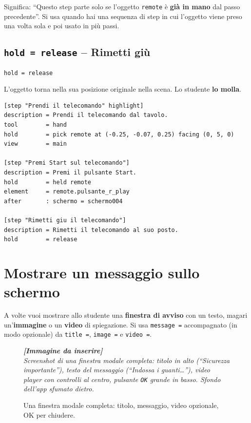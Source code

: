 ﻿\documentclass[a4paper,12pt,oneside]{book}
\newcommand{\kw}[1]{\texttt{\color{keycolor}#1}}
\newcommand{\imgph}[2]{%
  \begin{tcolorbox}[colback=cvtlightblue!30,colframe=cvtblue!40,%
    width=#1,halign=center,valign=center,height=5cm,boxrule=0.5pt,arc=3pt]%
    \textcolor{cvtgray}{\itshape\footnotesize\textbf{[Immagine da inserire]}\\[3pt]#2}%
  \end{tcolorbox}}
\begin{document}
Significa: ``Questo step parte solo se l'oggetto \texttt{remote} è
\textbf{già in mano} dal passo precedente''. Si usa quando hai una sequenza di
step in cui l'oggetto viene preso una volta sola e poi usato in più passi.

\section{\texttt{hold = release} -- Rimetti giù}

\begin{lstlisting}
hold = release
\end{lstlisting}

L'oggetto torna nella sua posizione originale nella scena. Lo studente
\textbf{lo molla}.

\begin{esempiocvt}
\begin{lstlisting}
[step "Prendi il telecomando" highlight]
description = Prendi il telecomando dal tavolo.
tool        = hand
hold        = pick remote at (-0.25, -0.07, 0.25) facing (0, 5, 0)
view        = main

[step "Premi Start sul telecomando"]
description = Premi il pulsante Start.
hold        = held remote
element     = remote.pulsante_r_play
after       : schermo = schermo004

[step "Rimetti giu il telecomando"]
description = Rimetti il telecomando al suo posto.
hold        = release
\end{lstlisting}
\end{esempiocvt}

\chapter{Mostrare un messaggio sullo schermo}
\label{ch:message}

A volte vuoi mostrare allo studente una \textbf{finestra di avviso} con un
testo, magari un'\textbf{immagine} o un \textbf{video} di spiegazione. Si usa
\kw{message =} accompagnato (in modo opzionale) da \kw{title =}, \kw{image =}
e \kw{video =}.

\begin{figure}[H]
  \centering
  \imgph{11cm}{Screenshot di una finestra modale completa: titolo in alto (``Sicurezza importante''), testo del messaggio (``Indossa i guanti\ldots''), video player con controlli al centro, pulsante \texttt{OK} grande in basso. Sfondo dell'app sfumato dietro.}
  \caption{Una finestra modale completa: titolo, messaggio, video opzionale, OK per chiudere.}
  \label{fig:modal-completo}
\end{figure}
\end{document}
